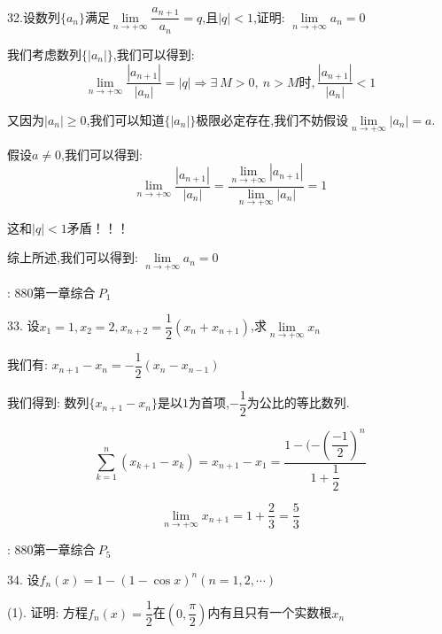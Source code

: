 32.设数列$\{a_{n}\}$满足$\lim\limits_{n\rightarrow+\infty}\dfrac{a_{n+1}}{a_{n}}=q$,且$|q|<1$,证明:  $\lim\limits_{n\rightarrow+\infty}a_{n}=0$
\begin{solution}
	
	我们考虑数列$\{|a_{n}|\}$,我们可以得到:  
	$$\lim\limits_{n\rightarrow +\infty}\dfrac{|a_{n+1}|}{|a_{n}|}=|q|\Rightarrow \exists\ M>0,\ n>M\text{时}, \dfrac{|a_{n+1}|}{|a_{n}|}<1$$
	
	又因为$|a_{n}|\geq 0$,我们可以知道$\{|a_{n}|\}$极限必定存在,我们不妨假设$\lim\limits_{n\rightarrow+\infty}|a_{n}|=a$.
	
	假设$a\neq 0$,我们可以得到:  $$\lim\limits_{n\rightarrow  +\infty}\dfrac{|a_{n+1}|}{|a_{n}|}=\dfrac{\lim\limits_{n\rightarrow  +\infty}|a_{n+1}|}{\lim\limits_{n\rightarrow  +\infty}|a_{n}|}=1$$
	
	这和$|q|<1$矛盾！！！
	
	
	综上所述,我们可以得到:  $\lim\limits_{n\rightarrow+\infty}a_{n}=0$
\end{solution}
\begin{anymark}[注]
	[题目来源]:  $880\text{第一章综合} \ P_{1}$
\end{anymark}

33. 设$x_{1}=1,x_{2}=2,x_{n+2}=\dfrac{1}{2}(x_{n}+x_{n+1})$,求$\lim\limits_{n\rightarrow+\infty}x_{n}$
\begin{solution}
	
	我们有:  $x_{n+1}-x_{n}=-\dfrac{1}{2}(x_{n}-x_{n-1})$
	
	我们得到:  数列$\{x_{n+1}-x_{n}\}$是以$1$为首项,$-\dfrac{1}{2}$为公比的等比数列.
	
	$$\sum\limits_{k=1}^{n}(x_{k+1}-x_{k})=x_{n+1}-x_{1}=\dfrac{1-(-(\dfrac{-1}{2})^{n}}{1+\dfrac{1}{2}}$$
	
	$$\lim\limits_{n\rightarrow +\infty}x_{n+1}=1+\dfrac{2}{3}=\dfrac{5}{3}$$
\end{solution}
\begin{anymark}[注]
	[题目来源]:  $880\text{第一章综合} \ P_{5}$
\end{anymark}

34. 设$f_{n}(x)=1-(1-\cos x)^n(n=1,2,\cdots)$

(1). 证明:  方程$f_{n}(x)=\dfrac{1}{2}$在$(0,\dfrac{\pi}{2})$内有且只有一个实数根$x_{n}$

